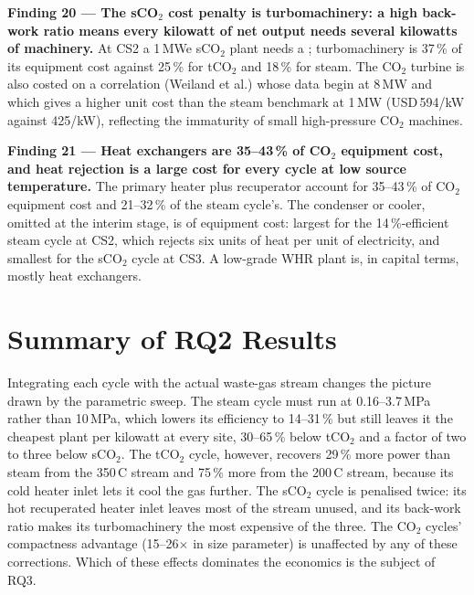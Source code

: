\begin{findingbox}
\textbf{Finding 20 --- The sCO$_2$ cost penalty is turbomachinery: a high
back-work ratio means every kilowatt of net output needs several kilowatts
of machinery.}
At CS2 a 1\,MWe sCO$_2$ plant needs a ; turbomachinery is 37\,\% of its equipment cost against
25\,\% for tCO$_2$ and 18\,\% for steam. The CO$_2$ turbine is also costed on
a correlation (Weiland et al.) whose data begin at 8\,MW and which gives a
higher unit cost than the steam benchmark at 1\,MW (USD\,594/kW against
425/kW), reflecting the immaturity of small high-pressure CO$_2$ machines.
\end{findingbox}

\begin{findingbox}
\textbf{Finding 21 --- Heat exchangers are 35--43\,\% of CO$_2$ equipment cost,
and heat rejection is a large cost for every cycle at low source
temperature.}
The primary heater plus recuperator account for 35--43\,\% of CO$_2$
equipment cost and 21--32\,\% of the steam cycle's. The condenser or cooler,
omitted at the interim stage, is  of equipment cost:
largest for the 14\,\%-efficient steam cycle at CS2, which rejects six units
of heat per unit of electricity, and smallest for the sCO$_2$ cycle at CS3.
A low-grade WHR plant is, in capital terms, mostly heat exchangers.
\end{findingbox}

\section{Summary of RQ2 Results}
\label{sec:rq2_summary}

Integrating each cycle with the actual waste-gas stream changes the picture
drawn by the parametric sweep. The steam cycle must run at 0.16--3.7\,MPa
rather than 10\,MPa, which lowers its efficiency to 14--31\,\% but still
leaves it the cheapest plant per kilowatt at every site, 30--65\,\% below
tCO$_2$ and a factor of two to three below sCO$_2$. The tCO$_2$ cycle,
however, recovers 29\,\% more power than steam from the 350\,\textdegree C
stream and 75\,\% more from the 200\,\textdegree C stream, because its cold
heater inlet lets it cool the gas further. The sCO$_2$ cycle is penalised
twice: its hot recuperated heater inlet leaves most of the stream unused,
and its back-work ratio makes its turbomachinery the most expensive of the
three. The CO$_2$ cycles' compactness advantage (15--26$\times$ in size
parameter) is unaffected by any of these corrections. Which of these effects
dominates the economics is the subject of RQ3.

